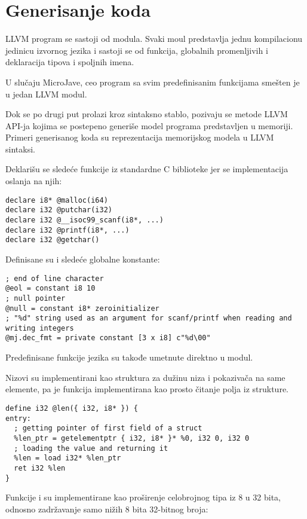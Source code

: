 \section{Generisanje koda}

LLVM program se sastoji od modula.
Svaki moul predstavlja jednu kompilacionu jedinicu izvornog jezika i sastoji se od funkcija, globalnih promenljivih i deklaracija tipova i spoljnih imena.

U slučaju MicroJave, ceo program sa svim predefinisanim funkcijama smešten je u jedan LLVM modul.

Dok se po drugi put prolazi kroz sintaksno stablo, pozivaju se metode LLVM API-ja kojima se postepeno generiše model programa predstavljen u memoriji.
Primeri generisanog koda su reprezentacija memorijskog modela u LLVM sintaksi.

Deklarišu se sledeće funkcije iz standardne C biblioteke jer se implementacija oslanja na njih:

\begin{lstlisting}
declare i8* @malloc(i64)
declare i32 @putchar(i32)
declare i32 @__isoc99_scanf(i8*, ...)
declare i32 @printf(i8*, ...)
declare i32 @getchar()
\end{lstlisting}

Definisane su i sledeće globalne konstante:

\begin{lstlisting}
; end of line character
@eol = constant i8 10
; null pointer
@null = constant i8* zeroinitializer
; "%d" string used as an argument for scanf/printf when reading and writing integers
@mj.dec_fmt = private constant [3 x i8] c"%d\00"
\end{lstlisting}

Predefinisane funkcije jezika su takođe umetnute direktno u modul.

Nizovi su implementirani kao struktura  za dužinu niza i pokazivača na same elemente, pa je  funkcija implementirana kao prosto čitanje polja iz strukture.

\begin{lstlisting}
define i32 @len({ i32, i8* }) {
entry:
  ; getting pointer of first field of a struct
  %len_ptr = getelementptr { i32, i8* }* %0, i32 0, i32 0
  ; loading the value and returning it
  %len = load i32* %len_ptr
  ret i32 %len
}
\end{lstlisting}

Funkcije  i  su implementirane kao proširenje celobrojnog tipa iz 8 u 32 bita, odnosno zadržavanje samo nižih 8 bita 32-bitnog broja:

